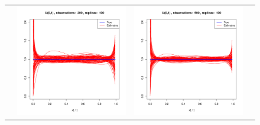 \begin{figure}[h]
\begin{tabular}{cccc}
	&
	\includegraphics[width=\textwidth/4]{../img/uniform/tilted/K1/densities/n200_R100.pdf}
	&
	\includegraphics[width=\textwidth/4]{../img/uniform/tilted/K1/densities/n500_R100.pdf}\\
	

\end{tabular}
\end{figure}
